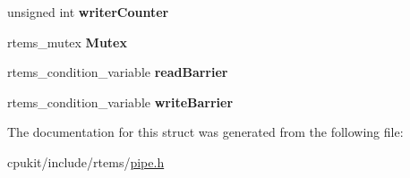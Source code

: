 \begin{DoxyCompactItemize}
unsigned int {\bfseries writer\+Counter}
\item 
\mbox{\label{structpipe__control_aabfd21b54e373a78e8b81f4eb9f5f358}} 
rtems\+\_\+mutex {\bfseries Mutex}
\item 
\mbox{\label{structpipe__control_a20586c9f952edebce951e3fb50debb3b}} 
rtems\+\_\+condition\+\_\+variable {\bfseries read\+Barrier}
\item 
\mbox{\label{structpipe__control_a546842dad7a59952f715dfea1c0391db}} 
rtems\+\_\+condition\+\_\+variable {\bfseries write\+Barrier}
\end{DoxyCompactItemize}


The documentation for this struct was generated from the following file\+:\begin{DoxyCompactItemize}
\item 
cpukit/include/rtems/\mbox{\hyperlink{pipe_8h}{pipe.\+h}}\end{DoxyCompactItemize}
